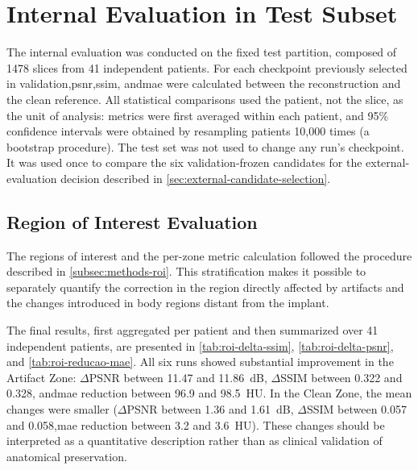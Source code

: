 \section{Internal Evaluation in Test Subset}

The internal evaluation was conducted on the fixed test partition, composed of 1478 slices from 41 independent patients. For each checkpoint previously selected in validation,\acrshort{psnr},\acrshort{ssim}, and\acrshort{mae} were calculated between the reconstruction and the clean reference. All statistical comparisons used the patient, not the slice, as the unit of analysis: metrics were first averaged within each patient, and 95\% confidence intervals were obtained by resampling patients 10,000 times (a bootstrap procedure). The test set was not used to change any run's checkpoint. It was used once to compare the six validation-frozen candidates for the external-evaluation decision described in \autoref{sec:external-candidate-selection}.

\subsection{Region of Interest Evaluation}
\label{sec:roi-evaluation}

The regions of interest and the per-zone metric calculation followed the procedure described in \autoref{subsec:methods-roi}. This stratification makes it possible to separately quantify the correction in the region directly affected by artifacts and the changes introduced in body regions distant from the implant.

The final results, first aggregated per patient and then summarized over 41 independent patients, are presented in \autoref{tab:roi-delta-ssim}, \autoref{tab:roi-delta-psnr}, and \autoref{tab:roi-reducao-mae}. All six runs showed substantial improvement in the Artifact Zone: $\Delta$PSNR between 11.47 and 11.86~dB, $\Delta$SSIM between 0.322 and 0.328, and\acrshort{mae} reduction between 96.9 and 98.5~HU. In the Clean Zone, the mean changes were smaller ($\Delta$PSNR between 1.36 and 1.61~dB, $\Delta$SSIM between 0.057 and 0.058,\acrshort{mae} reduction between 3.2 and 3.6~HU). These changes should be interpreted as a quantitative description rather than as clinical validation of anatomical preservation.

